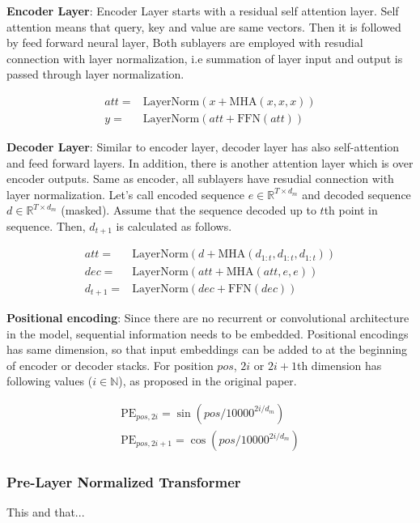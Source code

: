 \textbf{Encoder Layer}: Encoder Layer starts with a residual self attention layer. Self attention means that query, key and value are same vectors. Then it is followed by feed forward neural layer, Both sublayers are employed with resudial connection with layer normalization, i.e summation of layer input and output is passed through layer normalization.

\begin{equation}
\begin{split}
att = & \mathrm{LayerNorm}(x+ \mathrm{MHA}(x,x,x)) \\
y = & \mathrm{LayerNorm}(att+ \mathrm{FFN}(att))
\end{split}
\end{equation}

\textbf{Decoder Layer}: Similar to encoder layer, decoder layer has also self-attention and feed forward layers. In addition, there is another attention layer which is over encoder outputs. Same as encoder, all sublayers have resudial connection with layer normalization. Let's call encoded sequence $e \in \mathbb{R}^{T \times d_m}$ and decoded sequence $d \in \mathbb{R}^{T \times d_m}$ (masked). Assume that the sequence decoded up to $t$th point in sequence. Then, $d_{t+1}$ is calculated as follows.

\begin{equation}
\begin{split}
att = & \mathrm{LayerNorm}(d+ \mathrm{MHA}(d_{1:t},d_{1:t},d_{1:t})) \\
dec = & \mathrm{LayerNorm}(att+ \mathrm{MHA}(att,e,e)) \\
d_{t+1} = & \mathrm{LayerNorm}(dec+ \mathrm{FFN}(dec))
\end{split}
\end{equation}

\textbf{Positional encoding}: Since there are no recurrent or convolutional architecture in the model, sequential information needs to be embedded. Positional encodings has same dimension, so that input embeddings can be added to at the beginning of encoder or decoder stacks. For position $pos$, $2i$ or $2i+1$th dimension has following values ($i \in \mathbb{N}$), as proposed in the original paper.

\begin{equation}
\begin{split}
\mathrm{PE}_{pos,2i} = \sin(pos/10000^{2i/d_m}) \\
\mathrm{PE}_{pos,2i+1} = \cos(pos/10000^{2i/d_m})
\end{split}
\end{equation}

\subsubsection{Pre-Layer Normalized Transformer}
This and that...